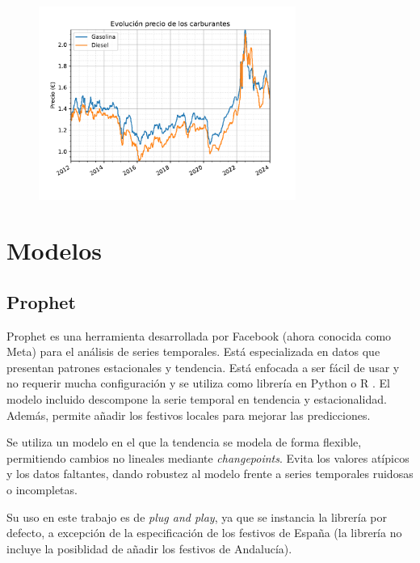 \begin{figure}[H]
	{\includegraphics[width=0.75\textwidth]{imagenes/grafica_carburantes.pdf}}
\end{figure}

\section{Modelos}

\subsection{Prophet}

Prophet \cite{prophet} es una herramienta desarrollada por Facebook (ahora conocida como Meta) para el análisis de series temporales. Está especializada en datos que presentan patrones estacionales y tendencia. Está enfocada a ser fácil de usar y no requerir mucha configuración y se utiliza como librería en Python o R \cite{R}. El modelo incluido descompone la serie temporal en tendencia y estacionalidad. Además, permite añadir los festivos locales para mejorar las predicciones.

Se utiliza un modelo en el que la tendencia se modela de forma flexible, permitiendo cambios no lineales mediante \textit{changepoints}. Evita los valores atípicos y los datos faltantes, dando robustez al modelo frente a series temporales ruidosas o incompletas.

Su uso en este trabajo es de \textit{plug and play}, ya que se instancia la librería por defecto, a excepción de la especificación de los festivos de España (la librería no incluye la posiblidad de añadir los festivos de Andalucía).

